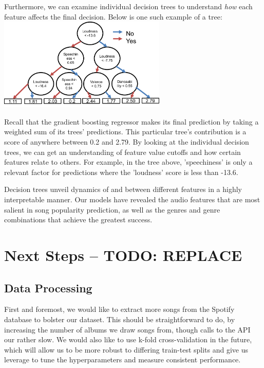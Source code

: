 \documentclass[journal]{IEEEtran}
\begin{document}
Furthermore, we can examine individual decision trees to understand \textit{how} each feature affects the final decision. Below is one such example of a tree: \\

\includegraphics[width=8cm]{images/gbm_example_tree.png}

\quad\newline
Recall that the gradient boosting regressor makes its final prediction by taking a weighted sum of its trees' predictions. This particular tree's contribution is a score of anywhere between 0.2 and 2.79. By looking at the individual decision trees, we can get an understanding of feature value cutoffs and how certain features relate to others. For example, in the tree above, 'speechiness' is only a relevant factor for predictions where the 'loudness' score is less than -13.6. 

Decision trees unveil dynamics of and between different features in a highly interpretable manner. Our models have revealed the audio features that are most salient in song popularity prediction, as well as the genres and genre combinations that achieve the greatest success. 


\section{Next Steps -- TODO: REPLACE}

\subsection{Data Processing}
First and foremost, we would like to extract more songs from the Spotify database to bolster our dataset. This should be straightforward to do, by increasing the number of albums we draw songs from, though calls to the API our rather slow. We would also like to use k-fold cross-validation in the future, which will allow us to be more robust to differing train-test splits and give us leverage to tune the hyperparameters and measure consistent performance.
\end{document}
